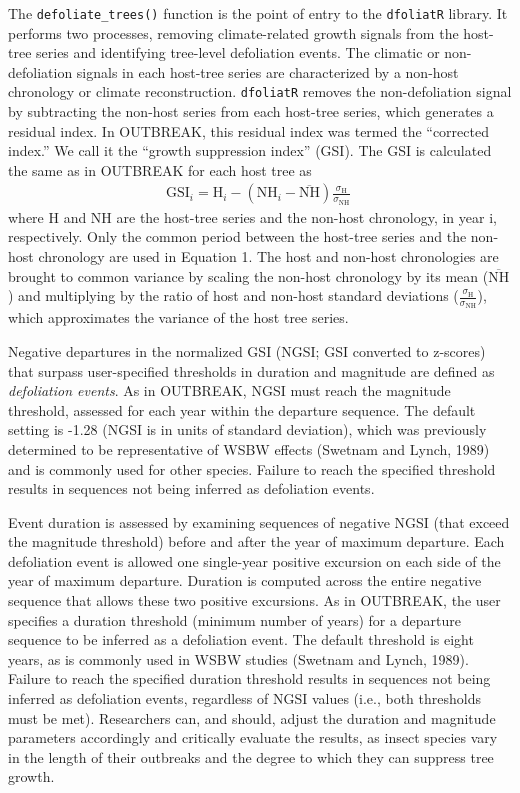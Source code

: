 \documentclass[review]{elsarticle} %
\begin{document}
The \texttt{defoliate\_trees()} function is the point of entry to the \texttt{dfoliatR} library. It performs two processes, removing climate-related growth signals from the host-tree series and identifying tree-level defoliation events. The climatic or non-defoliation signals in each host-tree series are characterized by a non-host chronology or climate reconstruction. \texttt{dfoliatR} removes the non-defoliation signal by subtracting the non-host series from each host-tree series, which generates a residual index. In OUTBREAK, this residual index was termed the ``corrected index.'' We call it the ``growth suppression index'' (GSI). The GSI is calculated the same as in OUTBREAK for each host tree as
\begin{align}
\textrm{GSI}_{i} = \textrm{H}_{i} - \left( \textrm{NH}_{i} - \overline{\textrm{NH}} \right) \frac{\sigma_{\textrm{H}}}{\sigma_{\textrm{NH}}} \
\end{align}
where H and NH are the host-tree series and the non-host chronology, in year i, respectively. Only the common period between the host-tree series and the non-host chronology are used in Equation 1. The host and non-host chronologies are brought to common variance by scaling the non-host chronology by its mean (\(\overline{\textrm{NH}}\)) and multiplying by the ratio of host and non-host standard deviations (\(\frac{\sigma_{\textrm{H}}}{\sigma_{\textrm{NH}}}\)), which approximates the variance of the host tree series.

Negative departures in the normalized GSI (NGSI; GSI converted to z-scores) that surpass user-specified thresholds in duration and magnitude are defined as \emph{defoliation events}. As in OUTBREAK, NGSI must reach the magnitude threshold, assessed for each year within the departure sequence. The default setting is -1.28 (NGSI is in units of standard deviation), which was previously determined to be representative of WSBW effects (Swetnam and Lynch, 1989) and is commonly used for other species. Failure to reach the specified threshold results in sequences not being inferred as defoliation events.

Event duration is assessed by examining sequences of negative NGSI (that exceed the magnitude threshold) before and after the year of maximum departure. Each defoliation event is allowed one single-year positive excursion on each side of the year of maximum departure. Duration is computed across the entire negative sequence that allows these two positive excursions. As in OUTBREAK, the user specifies a duration threshold (minimum number of years) for a departure sequence to be inferred as a defoliation event. The default threshold is eight years, as is commonly used in WSBW studies (Swetnam and Lynch, 1989). Failure to reach the specified duration threshold results in sequences not being inferred as defoliation events, regardless of NGSI values (i.e., both thresholds must be met). Researchers can, and should, adjust the duration and magnitude parameters accordingly and critically evaluate the results, as insect species vary in the length of their outbreaks and the degree to which they can suppress tree growth.
\end{document}
